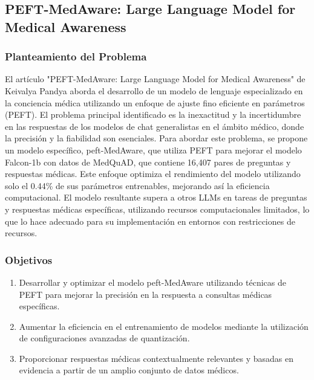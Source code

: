\subsection{PEFT-MedAware: Large Language Model for Medical Awareness \citep*{peftmedaware_2023}}
		\subsubsection{Planteamiento del Problema}
				El artículo "PEFT-MedAware: Large Language Model for Medical Awareness" de Keivalya Pandya aborda el desarrollo de un modelo de lenguaje especializado en la conciencia médica utilizando un enfoque de ajuste fino eficiente en parámetros (PEFT). El problema principal identificado es la inexactitud y la incertidumbre en las respuestas de los modelos de chat generalistas en el ámbito médico, donde la precisión y la fiabilidad son esenciales. Para abordar este problema, se propone un modelo específico, peft-MedAware, que utiliza PEFT para mejorar el modelo Falcon-1b con datos de MedQuAD, que contiene 16,407 pares de preguntas y respuestas médicas. Este enfoque optimiza el rendimiento del modelo utilizando solo el 0.44\% de sus parámetros entrenables, mejorando así la eficiencia computacional. El modelo resultante supera a otros LLMs en tareas de preguntas y respuestas médicas específicas, utilizando recursos computacionales limitados, lo que lo hace adecuado para su implementación en entornos con restricciones de recursos.
		
	\subsubsection{Objetivos}
		\begin{enumerate}
			\item Desarrollar y optimizar el modelo peft-MedAware utilizando técnicas de PEFT para mejorar la precisión en la respuesta a consultas médicas específicas.\vspace{-2mm}		
			\item Aumentar la eficiencia en el entrenamiento de modelos mediante la utilización de configuraciones avanzadas de quantización.\vspace{-2mm}
			\item Proporcionar respuestas médicas contextualmente relevantes y basadas en evidencia a partir de un amplio conjunto de datos médicos.\vspace{-2mm}
		\end{enumerate}
				
